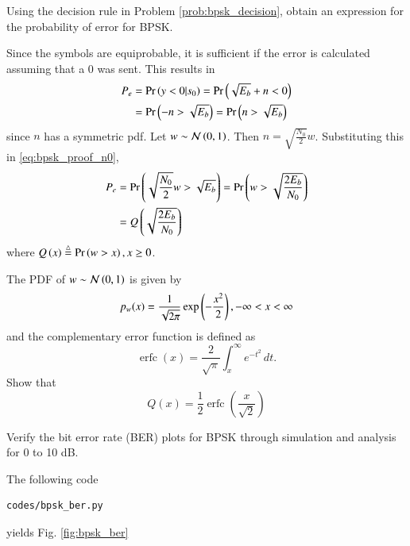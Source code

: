 \documentclass[journal,12pt,twocolumn]{IEEEtran}
\begin{document}
\begin{problem}
Using the decision rule in Problem \ref{prob:bpsk_decision}, obtain an expression for the probability of error for BPSK.
\end{problem}
\solution
Since the symbols are equiprobable, it is sufficient if the error is calculated assuming that a 0 was sent.  This results in
\begin{align}
P_e &= \Pr\left(y < 0|s_0\right) = \Pr\left(\sqrt{E_b} + n < 0\right)
\\
&= \Pr\left( -n > \sqrt{E_b} \right) = \Pr\left( n > \sqrt{E_b} \right)
\label{eq:bpsk_proof_n0}
\end{align}
since $n$ has a symmetric pdf.
Let $w \sim \mathcal{N}\left(0,1\right)$.  Then $n = \sqrt{\frac{N_0}{2}}w$. Substituting this in \eqref{eq:bpsk_proof_n0},
\begin{align}
P_e &=  \Pr\left( \sqrt{\frac{N_0}{2}}w > \sqrt{E_b} \right) = \Pr\left( w > \sqrt{\frac{2E_b}{N_0}} \right)
\\
&= Q\left(\sqrt{\frac{2E_b}{N_0}}\right)
\end{align}
%
where $Q\left(x\right) \stackrel{\triangle}{=} \Pr\left(w > x\right), x \ge 0$.
\begin{problem}
The PDF of $w \sim \mathcal{N}\left(0,1\right)$ is given by
%
\begin{equation}
p_{w}(x) = \frac{1}{\sqrt{2\pi}}\exp\left(-\frac{x^2}{2}\right), -\infty < x < \infty
\end{equation}
and the complementary error function is defined as
\begin{equation}
\operatorname {erfc} (x)={\frac {2}{\sqrt {\pi }}}\int _{x}^{\infty }e^{-t^{2}}\,dt.
\end{equation}
%
Show that 
\begin{equation}
Q(x) = \frac{1}{2}\operatorname {erfc}\left({\frac  {x}{{\sqrt  {2}}}}\right)
\end{equation}
\end{problem}
\begin{problem}
Verify the bit error rate (BER) plots for BPSK through simulation and analysis for 0 to 10 dB.
\end{problem}
\solution
The following code
\begin{lstlisting}
codes/bpsk_ber.py
\end{lstlisting}
yields Fig. \ref{fig:bpsk_ber}
\end{document}
